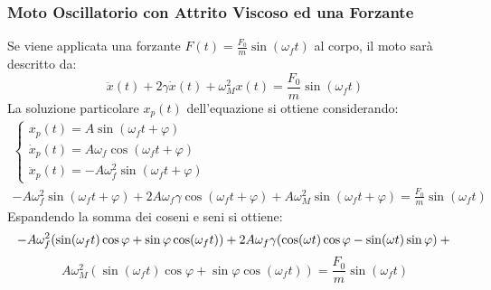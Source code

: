 \documentclass{article}
\numberwithin{equation}{subsection}
\begin{document}
\subsubsection{Moto Oscillatorio con Attrito Viscoso ed una Forzante}
Se viene applicata una forzante $F(t)=\displaystyle\frac{F_0}{m}\sin(\omega_f t)$ 
al corpo, il moto sarà descritto da: 
\begin{equation}
    \ddot x(t)+2\gamma\dot x(t)+\omega_M^{2}x(t)=\displaystyle\frac{F_0}{m}\sin(\omega_f t)
\end{equation}
La soluzione particolare $x_p(t)$ dell'equazione si ottiene considerando:
\begin{gather*}
    \begin{cases}
        x_p(t)=A\sin(\omega_f t+\varphi)\\
        \dot x_p(t)=A\omega_f\cos(\omega_f t+\varphi)\\
        \ddot x_p(t)=-A\omega_f^{2}\sin(\omega_f t+\varphi)
    \end{cases}\\
    -A\omega_f^{2}\sin(\omega_f t+\varphi)+
    2A\omega_f\gamma \cos(\omega_f t+\varphi)+
    A\omega_M^{2}\sin(\omega_f t+\varphi)=\displaystyle\frac{F_0}{m}\sin(\omega_f t)
\end{gather*}
Espandendo la somma dei coseni e seni si ottiene: 
\begin{equation*}
    -A\omega_f^{2}(\sin(\omega_f t)\cos\varphi+\sin\varphi \cos(\omega_f t))+
    2A\omega_f\gamma(\cos(\omega t)\cos\varphi-\sin(\omega t)\sin\varphi)+\\
\end{equation*}
\begin{equation*}
    A\omega_M^{2}(\sin(\omega_f t)\cos\varphi+\sin\varphi \cos(\omega_f t))=\displaystyle\frac{F_0}{m}\sin(\omega_f t)
\end{equation*}
\end{document}
